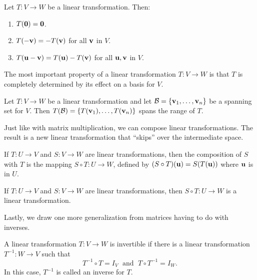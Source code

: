 \documentclass[../m073main.tex]{subfiles}
\begin{document}
\begin{theorem}
	Let $T : V \to W$ be a linear transformation.
	Then:
	\begin{enumerate}[label=(\alph*)]
		\item $T(\mathbf{0}) = \mathbf{0}$.
		\item $T(-\mathbf{v}) = -T(\mathbf{v})$ for all $\mathbf{v}$ in $V$.
		\item $T(\mathbf{u} - \mathbf{v}) = T(\mathbf{u}) - T(\mathbf{v})$ for all $\mathbf{u}, \mathbf{v}$ in $V$.
	\end{enumerate}
\end{theorem}

The most important property of a linear transformation $T : V \to W$ is that $T$ is completely determined by its effect on a basis for $V$.

\begin{theorem}
	Let $T : V \to W$ be a linear transformation and let $\mathcal{B} = \{\mathbf{v}_1, \ldots, \mathbf{v}_n\}$ be a spanning set for $V$.
	Then $T(\mathcal{B}) = \{T(\mathbf{v}_1), \ldots, T(\mathbf{v}_n)\}$ spans the range of $T$.
\end{theorem}

Just like with matrix multiplication, we can compose linear transformations.
The result is a new linear transformation that ``skips'' over the intermediate space.

\begin{definition}
	If $T : U \to V$ and $S : V \to W$ are linear transformations, then the composition of $S$ with $T$ is the mapping $S \circ T : U \to W$, defined by $(S \circ T)(\mathbf{u}) = S(T(\mathbf{u}))$ where $\mathbf{u}$ is in $U$.
\end{definition}

\begin{theorem}
	If $T : U \to V$ and $S : V \to W$ are linear transformations, then $S \circ T : U \to W$ is a linear transformation.
\end{theorem}

Lastly, we draw one more generalization from matrices having to do with inverses.

\begin{definition}
	A linear transformation $T : V \to W$ is invertible if there is a linear transformation $T^{-1} : W \to V$ such that
	\[ T^{-1} \circ T = I_V \;\text{ and }\; T \circ T^{-1} = I_W. \]
	In this case, $T^{-1}$ is called an inverse for $T$.
\end{definition}
\end{document}

